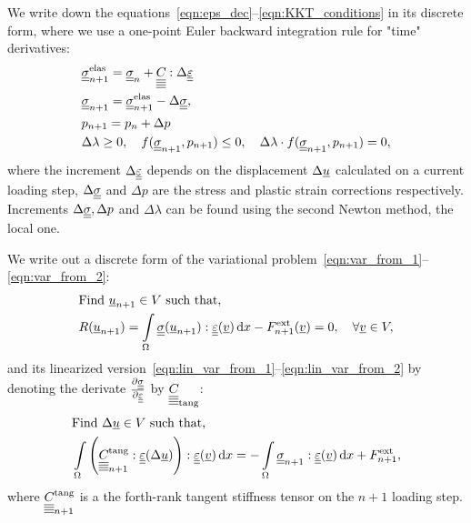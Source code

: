 \documentclass[12pt]{article}
\begin{document}
We write down the equations~\eqref{eqn:eps_dec}--\eqref{eqn:KKT_conditions} in its discrete form, where we use a one-point Euler backward integration rule for "time" derivatives:
\begin{align}
    & \uusigmanelas = \uusigma_n + \uuuuC{} : \Delta\uueps \label{eqn:return-mapping_1}\\
    & \uusigman = \uusigmanelas - \Delta\uusigma, \\
    & p_{n+1} = p_n + \Delta p \\%
    & \Delta\lambda \geq 0, \quad f(\uusigman, p_{n+1}) \leq 0, \quad \Delta\lambda\cdot f(\uusigman, p_{n+1}) = 0, \label{eqn:return-mapping_end}
\end{align}
where the increment $\Delta\underline{\underline{\varepsilon}}$ depends on the displacement $\Delta\underline{u}$ calculated on a current loading step, $\Delta\underline{\underline{\sigma}}$ and $\Delta p$ are the stress and plastic strain corrections respectively. Increments $\Delta\underline{\underline{\sigma}}, \Delta p$ and $\Delta\lambda$ can be found using the second Newton method, the local one.

We write out a discrete form of the variational problem~\eqref{eqn:var_from_1}--\eqref{eqn:var_from_2}:
\begin{align}
    & \text{Find } \underline{u}_{n+1} \in V \text{ such that,} \label{eqn:var_disc_from_1} \\ 
    & R(\underline{u}_{n+1}) = \int\limits_\Omega\underline{\underline{\sigma}}(\underline{u}_{n+1}) : \underline{\underline{\varepsilon}}(\underline{v}) \, \mathrm{d} x - F_{n+1}^\text{ext}(\underline{v}) = 0, \quad \forall \underline{v} \in V \label{eqn:var_disc_from_2},
\end{align}
and its linearized version~\eqref{eqn:lin_var_from_1}--\eqref{eqn:lin_var_from_2} by denoting the derivate $\frac{\partial\underline{\underline{\sigma}}}{\partial\underline{\underline{\varepsilon}}}$ by $\underline{\underline{\underline{\underline{C_{}}}}}_{\text{tang}}$:
\begin{align}
    & \text{Find } \Delta\underline{u} \in V \text{ such that,} \label{eqn:lin_var_disc_from_1} \\ 
    & \int\limits_\Omega \left(\underline{\underline{\underline{\underline{C_{}}}}}_{n+1}^\text{tang} : \underline{\underline{\varepsilon}}(\Delta\underline{u})\right) : \underline{\underline{\varepsilon}}(\underline{v}) \, \mathrm{d} x = -\int\limits_\Omega\underline{\underline{\sigma}}_{n+1} : \underline{\underline{\varepsilon}}(\underline{v}) \, \mathrm{d} x + F^\text{ext}_{n+1} \label{eqn:lin_var_disc_from_2},
\end{align}
where $\underline{\underline{\underline{\underline{C_{}}}}}_{n+1}^{\text{tang}}$ is a the forth-rank tangent stiffness tensor on the $n+1$ loading step.
\end{document}
